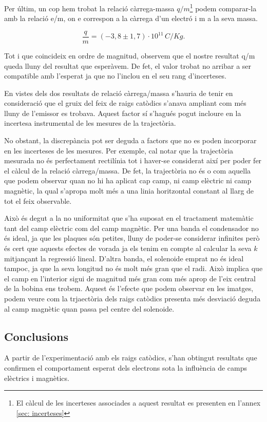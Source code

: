 \documentclass[11pt]{article}
\numberwithin{equation}{section}
\numberwithin{figure}{section}
\numberwithin{table}{section}
\begin{document}
Per últim, un cop hem trobat la relació càrrega-massa $q/m$\footnote{El càlcul de les incerteses associades a aquest resultat es presenten en l'annex \ref{sec: incerteses}} podem comparar-la amb la relació e/m, on e correspon a la càrrega d'un electró i m a la seva massa.

\[
\boxed{\frac{q}{m}=(-3,8 \pm 1,7)\cdot 10^{11}\, C/Kg.}
\] 

Tot i que coincideix en ordre de magnitud, observem que el nostre resultat q/m queda lluny del resultat que esperàvem. De fet, el valor trobat no arribar a ser compatible amb l'esperat ja que no l'inclou en el seu rang d'incerteses. 

En vistes dels dos resultats de relació càrrega/massa s'hauria de tenir en consideració que el gruix del feix de raigs catòdics s'anava ampliant com més lluny de l'emissor es trobava. Aquest factor sí s'hagués pogut incloure en la incertesa instrumental de les mesures de la trajectòria.

No obstant, la discrepància pot ser deguda a factors que no es poden incorporar en les incerteses de les mesures. Per exemple, cal notar que la trajectòria mesurada no és perfectament rectilínia tot i haver-se considerat així per poder fer el càlcul de la relació càrrega/massa. De fet, la trajectòria no és o com aquella que podem observar quan no hi ha aplicat cap camp, ni camp elèctric ni camp magnètic, la qual s'apropa molt més a una linia horitzontal constant al llarg de tot el feix observable. 

Això és degut a la no uniformitat que s'ha suposat en el tractament matemàtic tant del camp elèctric com del camp magnètic. Per una banda el condensador no és ideal, ja que les plaques són petites, lluny de poder-se considerar infinites però és cert que aquests efectes de vorada ja els tenim en compte al calcular la seva $k$ mitjançant la regressió lineal. D'altra banda, el solenoide emprat no és ideal tampoc, ja que la seva longitud no és molt més gran que el radi. Això implica que el camp en l'interior sigui de magnitud més gran com més aprop de l'eix central de la bobina ens trobem. Aquest és l'efecte que podem observar en les imatges, podem veure com la trjaectòria dels raigs catòdics presenta més desviació deguda al camp magnètic quan passa pel centre del solenoide.

\subsection{Conclusions}
A partir de l'experimentació amb els raigs catòdics, s'han obtingut resultats que confirmen el comportament esperat dels electrons sota la influència de camps elèctrics i magnètics. 
    
\end{document}
